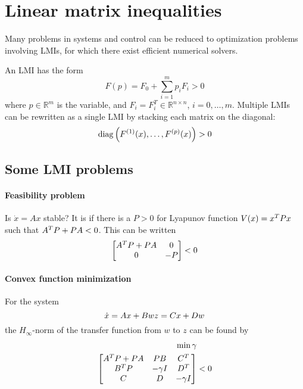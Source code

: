 \section{Linear matrix inequalities}
Many problems in systems and control can be reduced to optimization problems involving LMIs, for which there exist efficient numerical solvers.

An LMI has the form
\begin{equation}
  F(p) = F_0 + \sum_{i=1}^m p_i F_i > 0
\end{equation}
where $p \in \mathbb{R}^m$ is the variable, and $F_i = F_i^T \in \mathbb{R}^{n \times n}$, $i = 0, \dots, m$. Multiple LMIs can be rewritten as a single LMI by stacking each matrix on the diagonal:
\begin{equation}
  \operatorname{diag} \left( F^{(1)}(x), \dots, F^{(p)}(x) \right) > 0
\end{equation}

\subsection{Some LMI problems}
\paragraph{Feasibility problem} Is $\dot{x} = Ax$ stable? It is if there is a $P > 0$ for Lyapunov function $V(x) = x^{T} P x$ such that $A^{T} P + PA < 0$. This can be written
\begin{equation}
  \begin{bmatrix}
    A^{T} P + PA & 0 \\
    0 & -P
  \end{bmatrix}
  < 0
\end{equation}

\paragraph{Convex function minimization} For the system
\begin{equation}
  \dot{x} = Ax + Bw \\
  z = Cx + Dw
\end{equation}
the $H_\infty$-norm of the transfer function from $w$ to $z$ can be found by
\begin{equation}
\begin{split}
  \min \gamma & \\
  \begin{bmatrix}
    A^{T} P + PA & PB & C^{T} \\
    B^{T} P & -\gamma I & D^{T} \\
    C & D & -\gamma I
  \end{bmatrix}
  & < 0
\end{split}
\end{equation}

